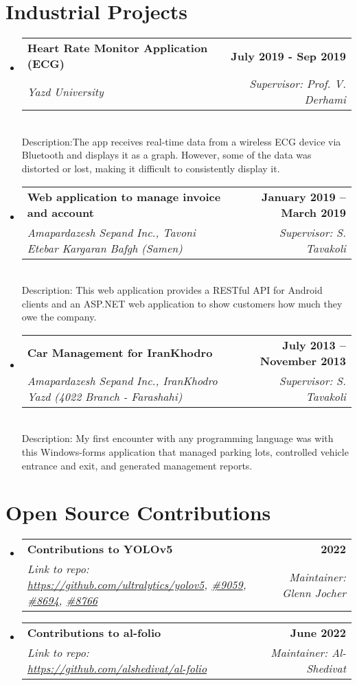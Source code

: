 \documentclass[letterpaper,11pt]{article}
\makeatletter
\newcommand{\resumeSubheading}[4]{
  \vspace{-2pt}\item
    \begin{tabular*}{1.0\textwidth}[t]{l@{\extracolsep{\fill}}r}
      \textbf{#1} & \textbf{\small #2} \\
    \textcolor{sgray} {\textit{\small#3}} & \textcolor{sgray}{ \textit{\small #4} }\\
    \end{tabular*}\vspace{-7pt}
}
\newcommand{\resumeSubheadingD}[5]{
  \vspace{-2pt}\item
    \begin{tabular*}{1.0\textwidth}[t]{l@{\extracolsep{\fill}}r}
      \textbf{#1} & \textbf{\small #2} \\
    \textcolor{sgray} {\textit{\small#3}} & \textcolor{sgray}{ \textit{\small #4} }\\
    \end{tabular*} %
    \\ \vspace{3pt}
    Description:{#5}
}
\newcommand{\resumeSubHeadingListStart}{\begin{itemize}[leftmargin=0.0in, label={}]}
\newcommand{\resumeSubHeadingListEnd}{\end{itemize}}
\makeatother
\begin{document}

\section{Industrial Projects}

\resumeSubHeadingListStart
\resumeSubheadingD
{Heart Rate Monitor Application (ECG)}{
	July 2019 - Sep 2019
}
{Yazd University}
{Supervisor: Prof. V. Derhami}
{The app receives real-time data from a wireless ECG device via Bluetooth and displays it as a graph. However, some of the data was distorted or lost, making it difficult to consistently display it. }
\resumeSubHeadingListEnd


\resumeSubHeadingListStart
\resumeSubheadingD
{Web application to manage invoice and account }{January 2019 – March 2019}
{Amapardazesh Sepand Inc., Tavoni Etebar Kargaran Bafgh (Samen)}{Supervisor: S. Tavakoli}
{
	This web application provides a RESTful API for Android clients and an ASP.NET web application to show customers how much they owe the company.}
\resumeSubHeadingListEnd




\resumeSubHeadingListStart
\resumeSubheadingD
{Car Management for IranKhodro}{July 2013 – November 2013}
{Amapardazesh Sepand Inc., IranKhodro Yazd (4022 Branch - Farashahi)}{Supervisor: S. Tavakoli}
{ My first encounter with any programming language was with this Windows-forms application that managed parking lots, controlled vehicle entrance and exit, and generated management reports. }
\resumeSubHeadingListEnd




\section{Open Source Contributions}

\resumeSubHeadingListStart
\resumeSubheading
{Contributions to YOLOv5}{2022}
{Link to repo: \url{https://github.com/ultralytics/yolov5},
	\href{https://github.com/ultralytics/yolov5/issues/9059}{\#9059},
	\href{https://github.com/ultralytics/yolov5/pull/8694}{\#8694},
	\href{https://github.com/ultralytics/yolov5/pull/8766}{\#8766}  
}{Maintainer: Glenn Jocher}{ 
}
\resumeSubHeadingListEnd
\resumeSubHeadingListStart
\resumeSubheading
{Contributions to al-folio}{June 2022}
{Link to repo: \url{https://github.com/alshedivat/al-folio} }{Maintainer: Al-Shedivat}{
	
}
\resumeSubHeadingListEnd
\end{document}
